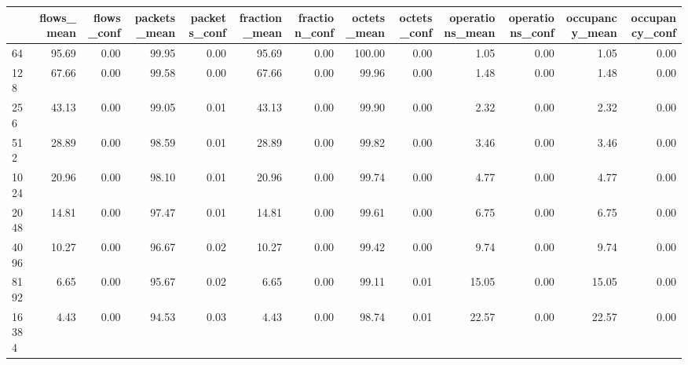 \begin{tabular}{lrrrrrrrrrrrr}
\toprule
{} &  flows\_mean &  flows\_conf &  packets\_mean &  packets\_conf &  fraction\_mean &  fraction\_conf &  octets\_mean &  octets\_conf &  operations\_mean &  operations\_conf &  occupancy\_mean &  occupancy\_conf \\
\midrule
64         &       95.69 &        0.00 &         99.95 &          0.00 &          95.69 &           0.00 &       100.00 &         0.00 &             1.05 &             0.00 &            1.05 &            0.00 \\
128        &       67.66 &        0.00 &         99.58 &          0.00 &          67.66 &           0.00 &        99.96 &         0.00 &             1.48 &             0.00 &            1.48 &            0.00 \\
256        &       43.13 &        0.00 &         99.05 &          0.01 &          43.13 &           0.00 &        99.90 &         0.00 &             2.32 &             0.00 &            2.32 &            0.00 \\
512        &       28.89 &        0.00 &         98.59 &          0.01 &          28.89 &           0.00 &        99.82 &         0.00 &             3.46 &             0.00 &            3.46 &            0.00 \\
1024       &       20.96 &        0.00 &         98.10 &          0.01 &          20.96 &           0.00 &        99.74 &         0.00 &             4.77 &             0.00 &            4.77 &            0.00 \\
2048       &       14.81 &        0.00 &         97.47 &          0.01 &          14.81 &           0.00 &        99.61 &         0.00 &             6.75 &             0.00 &            6.75 &            0.00 \\
4096       &       10.27 &        0.00 &         96.67 &          0.02 &          10.27 &           0.00 &        99.42 &         0.00 &             9.74 &             0.00 &            9.74 &            0.00 \\
8192       &        6.65 &        0.00 &         95.67 &          0.02 &           6.65 &           0.00 &        99.11 &         0.01 &            15.05 &             0.00 &           15.05 &            0.00 \\
16384      &        4.43 &        0.00 &         94.53 &          0.03 &           4.43 &           0.00 &        98.74 &         0.01 &            22.57 &             0.00 &           22.57 &            0.00 \\

\end{tabular}
